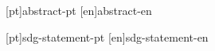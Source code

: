 %
%
%
%
[pt]{abstract-pt}  %
[en]{abstract-en}  %



%
%
[pt]{sdg-statement-pt}
[en]{sdg-statement-en}



